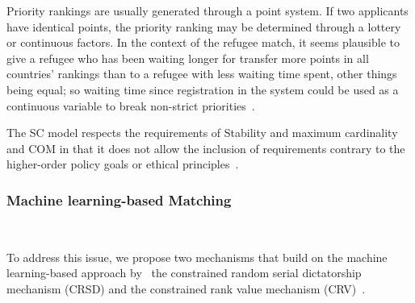 Priority rankings are usually generated through a point system.
If two applicants have identical points, the priority ranking may be determined through a lottery or continuous factors.
In the context  of the refugee match, it seems plausible to give a refugee who has been waiting longer for transfer  more points in all countries’ rankings than to a refugee with less waiting time spent, other things being  equal;
so waiting time since registration in the system could be used as a continuous variable to break non-strict priorities~\cite{basshuysen}.

The SC model respects the requirements of Stability and maximum cardinality and COM in that it does not allow the inclusion of requirements contrary to the higher-order policy goals or ethical principles~\cite{basshuysen}.

\subsubsection{Machine learning-based Matching}\label{machine-learning-based-matching}~\citet{olbergml}

To address this issue, we propose two mechanisms that build on the machine learning-based approach by~\citet{bansak_2018} the constrained random serial dictatorship mechanism
(CRSD) and the constrained rank value mechanism (CRV)~\citet{olbergml}.



